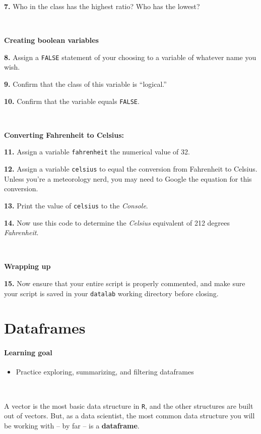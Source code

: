 \documentclass[
]{book}
\providecommand{\tightlist}{%
  \setlength{\itemsep}{0pt}\setlength{\parskip}{0pt}}
\begin{document}
\textbf{7.} Who in the class has the highest ratio? Who has the lowest?

~

\textbf{Creating boolean variables}

\textbf{8.} Assign a \texttt{FALSE} statement of your choosing to a variable of whatever name you wish.

\textbf{9.} Confirm that the class of this variable is ``logical.''

\textbf{10.} Confirm that the variable equals \texttt{FALSE}.

~

\textbf{Converting Fahrenheit to Celsius:}

\textbf{11.} Assign a variable \texttt{fahrenheit} the numerical value of 32.

\textbf{12.} Assign a variable \texttt{celsius} to equal the conversion from Fahrenheit to Celsius. Unless you're a meteorology nerd, you may need to Google the equation for this conversion.

\textbf{13.} Print the value of \texttt{celsius} to the \emph{Console}.

\textbf{14.} Now use this code to determine the \emph{Celsius} equivalent of 212 degrees \emph{Fahrenheit}.

~

\textbf{Wrapping up}

\textbf{15.} Now ensure that your entire script is properly commented, and make sure your script is saved in your \texttt{datalab} working directory before closing.

\hypertarget{dataframes}{%
\chapter{Dataframes}\label{dataframes}}

\hypertarget{learning-goal}{%
\subsubsection*{Learning goal}\label{learning-goal}}

\begin{itemize}
\tightlist
\item
  Practice exploring, summarizing, and filtering dataframes
\end{itemize}

~

A vector is the most basic data structure in \texttt{R}, and the other structures are built out of vectors. But, as a data scientist, the most common data structure you will be working with -- by far -- is a \textbf{dataframe}.
\end{document}
